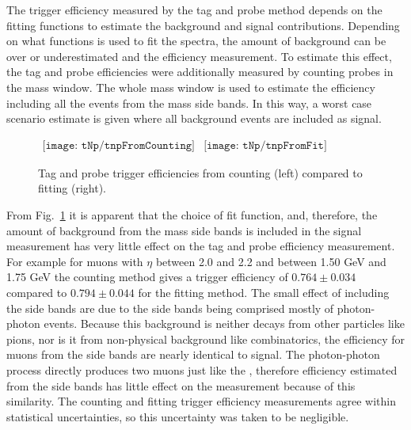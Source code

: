       The trigger efficiency measured by the tag and probe method depends on
        the fitting functions \DIFdelbegin {}\DIFdelend \DIFaddbegin {}\DIFaddend to estimate the background and signal 
        contributions. 
      Depending on what functions is used to fit the spectra, the amount of
        background can be over or underestimated and \DIFdelbegin {}\DIFdelend \DIFaddbegin {}\DIFaddend the efficiency 
        measurement.
      To estimate this effect, the tag and probe efficiencies were additionally
        measured by counting probes in the \JPsi{} mass window. 
      The whole mass window is used to estimate the efficiency including all 
        the events from the mass side bands.
      In this way, a worst case scenario estimate is given where all background
        events are included as signal. 
      \begin{figure}[!Hhbt]
        \centering
        $ \begin{array}{cc}
          \texttt{[image: tNp/tnpFromCounting]} &
          \texttt{[image: tNp/tnpFromFit]}
        \end{array} $ 
        \caption{Tag and probe trigger efficiencies from counting (left) 
          compared to fitting (right).}
        \label{fig:tnpCntVFit}
      \end{figure}

      From Fig.~\ref{fig:tnpCntVFit} it is apparent that the choice of fit 
        function, and, therefore, the amount of background from the mass side 
        bands is included in the signal measurement has very little effect on 
        the tag and probe efficiency measurement.
      For example for muons with $\eta$ between 2.0 and 2.2 and \pt{} between
        1.50 GeV and 1.75 GeV the counting method gives a trigger efficiency 
        of $0.764 \pm 0.034$ compared to $0.794 \pm 0.044$ for the fitting 
        method. 
      The small effect of including the side bands are due to the side bands 
        being comprised mostly of photon-photon events.
      Because this background is neither decays from other particles like pions,
        nor is it from non-physical background like combinatorics, 
        the efficiency for muons from the side bands are nearly identical to
        \JPsi{} signal.
      The photon-photon process directly produces two muons just like the 
        \JPsi{}, therefore efficiency estimated from the side bands has 
        little effect on the measurement because of this similarity.
      The counting and fitting trigger efficiency measurements agree within 
        statistical uncertainties, so this uncertainty was taken to be 
        negligible.

